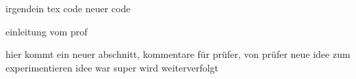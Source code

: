 irgendein tex code
neuer code

einleitung vom prof

hier kommt ein neuer abschnitt, kommentare für prüfer, von prüfer
neue idee zum experimentieren
idee war super wird weiterverfolgt
